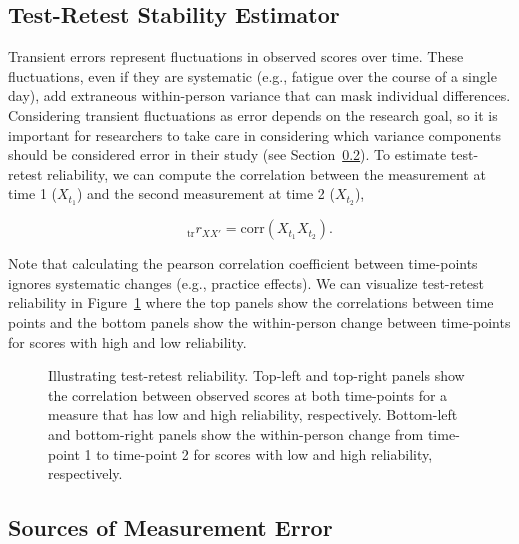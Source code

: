 \documentclass[
  letterpaper,
  DIV=11,
  numbers=noendperiod]{scrreprt}
\begin{document}
\subsection{Test-Retest Stability
Estimator}\label{test-retest-stability-estimator}

Transient errors represent fluctuations in observed scores over time.
These fluctuations, even if they are systematic (e.g., fatigue over the
course of a single day), add extraneous within-person variance that can
mask individual differences. Considering transient fluctuations as error
depends on the research goal, so it is important for researchers to take
care in considering which variance components should be considered error
in their study (see Section~\ref{sec-sources}). To estimate test-retest
reliability, we can compute the correlation between the measurement at
time 1 (\(X_{t_1}\)) and the second measurement at time 2 (\(X_{t_2}\)),

\[
_\text{tr}r_{XX'}= \text{corr}(X_{t_1}X_{t_2}).
\]

Note that calculating the pearson correlation coefficient between
time-points ignores systematic changes (e.g., practice effects). We can
visualize test-retest reliability in Figure~\ref{fig-test-retest} where
the top panels show the correlations between time points and the bottom
panels show the within-person change between time-points for scores with
high and low reliability.

\begin{figure}[H]


\caption{\label{fig-test-retest}Illustrating test-retest reliability.
Top-left and top-right panels show the correlation between observed
scores at both time-points for a measure that has low and high
reliability, respectively. Bottom-left and bottom-right panels show the
within-person change from time-point 1 to time-point 2 for scores with
low and high reliability, respectively.}

\end{figure}%

\subsection{Sources of Measurement Error}\label{sec-sources}
\end{document}
